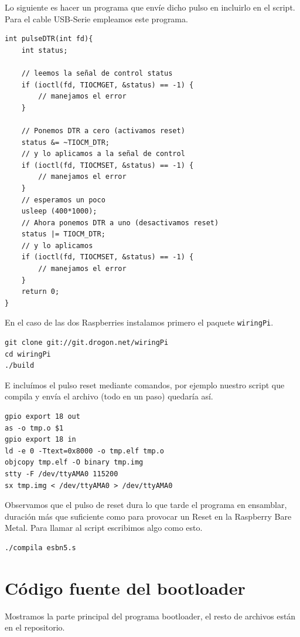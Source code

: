 Lo siguiente es hacer un programa que envíe dicho pulso en incluirlo en el script. Para
el cable USB-Serie empleamos este programa.

\begin{lstlisting}
int pulseDTR(int fd){
    int status;

    // leemos la señal de control status
    if (ioctl(fd, TIOCMGET, &status) == -1) {
        // manejamos el error
    }

    // Ponemos DTR a cero (activamos reset)
    status &= ~TIOCM_DTR;
    // y lo aplicamos a la señal de control
    if (ioctl(fd, TIOCMSET, &status) == -1) {
        // manejamos el error
    }
    // esperamos un poco
    usleep (400*1000);
    // Ahora ponemos DTR a uno (desactivamos reset)
    status |= TIOCM_DTR;
    // y lo aplicamos
    if (ioctl(fd, TIOCMSET, &status) == -1) {
        // manejamos el error
    }
    return 0;
}
\end{lstlisting}

En el caso de las dos Raspberries instalamos primero el paquete {\tt wiringPi}.

\begin{lstlisting}
git clone git://git.drogon.net/wiringPi
cd wiringPi
./build
\end{lstlisting}

E incluímos el pulso reset mediante comandos, por ejemplo nuestro script que compila
y envía el archivo (todo en un paso) quedaría así.

\begin{lstlisting}
gpio export 18 out
as -o tmp.o $1
gpio export 18 in
ld -e 0 -Ttext=0x8000 -o tmp.elf tmp.o
objcopy tmp.elf -O binary tmp.img
stty -F /dev/ttyAMA0 115200
sx tmp.img < /dev/ttyAMA0 > /dev/ttyAMA0
\end{lstlisting}

Observamos que el pulso de reset dura lo que tarde el programa en ensamblar, duración
más que suficiente como para provocar un Reset en la Raspberry Bare Metal. Para llamar
al script escribimos algo como esto.

\begin{lstlisting}
./compila esbn5.s
\end{lstlisting}

\section{Código fuente del bootloader}

Mostramos la parte principal del programa bootloader, el resto de archivos están
en el repositorio.

